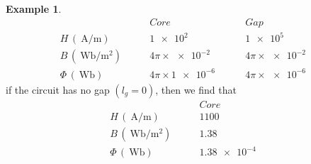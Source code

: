 \documentclass[11pt,a4paper,oneside]{book}
\numberwithin{equation}{section}
\theoremstyle{it}
\theoremstyle{definition}
\newtheorem{example}{Example}[section]
\begin{document}
\begin{example}
\begin{equation*}
	\boxed{\begin{matrix}
		\quad&\quad Core \quad&\quad Gap \\[6pt]
		H\,(\SI{}{\ampere\per\meter}) \quad&\quad \SI{1e2}{} \quad&\quad \SI{1e5}{} \\[6pt]
		B\,(\SI{}{\weber\per\square\meter}) \quad&\quad 4\pi\times\SI{e-2}{} \quad&\quad 4\pi\times\SI{e-2}{} \\[6pt]
		\Phi\,(\SI{}{\weber}) \quad&\quad 4\pi\times\SI{1e-6}{} \quad&\quad 4\pi\times\SI{e-6}{}
	\end{matrix}}
\end{equation*}
if the circuit has no gap $(l_g=0)$, then we find that
\begin{equation*}
	\boxed{\begin{matrix}
			\quad&\quad Core \\[6pt]
			H\,(\SI{}{\ampere\per\meter}) \quad&\quad \SI{1100}{} \\[6pt]
			B\,(\SI{}{\weber\per\square\meter}) \quad&\quad \SI{1.38}{} \\[6pt]
			\Phi\,(\SI{}{\weber}) \quad&\quad \SI{1.38 e-4}{}
	\end{matrix}}
\end{equation*}
\end{example}
\end{document}
